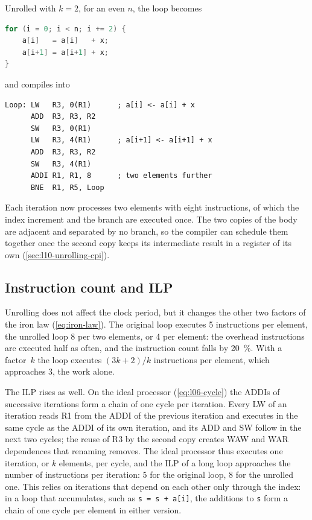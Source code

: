 \documentclass[../main.tex]{subfiles}
\begin{document}
Unrolled with $k=2$, for an even $n$, the loop becomes
\begin{lstlisting}[language=C, numbers=none]
for (i = 0; i < n; i += 2) {
    a[i]   = a[i]   + x;
    a[i+1] = a[i+1] + x;
}
\end{lstlisting}
and compiles into
\begin{lstlisting}[language={[x86masm]Assembler}, numbers=none]
Loop: LW   R3, 0(R1)      ; a[i] <- a[i] + x
      ADD  R3, R3, R2
      SW   R3, 0(R1)
      LW   R3, 4(R1)      ; a[i+1] <- a[i+1] + x
      ADD  R3, R3, R2
      SW   R3, 4(R1)
      ADDI R1, R1, 8      ; two elements further
      BNE  R1, R5, Loop
\end{lstlisting}
Each iteration now processes two elements with eight instructions, of which
the index increment and the branch are executed once.  The two copies of the body are adjacent
and separated by no branch, so the compiler can schedule them together once
the second copy keeps its intermediate result in a register of its own
(\cref{sec:l10-unrolling-cpi}).

\subsection{Instruction count and ILP}
\label{sec:l10-unrolling-ilp}

Unrolling does not affect the clock period, but it changes the other two
factors of the iron law (\cref{eq:iron-law}).  The original loop executes 5
instructions per element, the unrolled loop 8 per two elements, or 4 per
element: the overhead instructions are executed half as often, and the
instruction count falls by \SI{20}{\percent}.  With a factor~$k$ the loop
executes $(3k+2)/k$ instructions per element, which approaches 3, the work
alone.

The ILP rises as well.  On the ideal processor (\cref{eq:l06-cycle}) the
ADDIs of successive iterations form a chain of one cycle per iteration.  Every
LW of an iteration reads R1 from the ADDI of the previous iteration and
executes in the same cycle as the ADDI of its own iteration, and its ADD and
SW follow in the next two cycles; the reuse of R3 by the second copy creates
WAW and WAR dependences that renaming removes.  The ideal processor thus executes
one iteration, or $k$ elements, per cycle, and the ILP of a long loop
approaches the number of instructions per iteration: 5 for the original loop,
8 for the unrolled one.  This relies on iterations that depend on each other
only through the index: in a loop that accumulates, such as
\texttt{s = s + a[i]}, the additions to \texttt{s} form a chain of one cycle
per element in either version.
\end{document}
